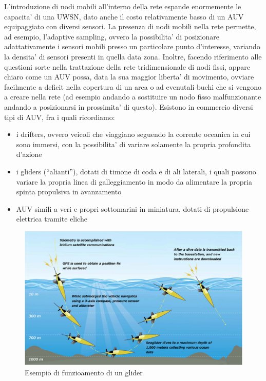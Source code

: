 L'introduzione di nodi mobili all'interno della rete espande enormemente le capacita' di una UWSN, dato anche il costo relativamente basso di un AUV equipaggiato con diversi sensori. \newline
La presenza di nodi mobili nella rete permette, ad esempio, l'adaptive sampling, ovvero la possibilita' di posizionare adattativamente i sensori mobili presso un particolare punto d'interesse, variando la densita' di sensori presenti in quella data zona. \newline
Inoltre, facendo riferimento alle questioni sorte nella trattazione della rete tridimensionale di nodi fissi, appare chiaro come un AUV possa, data la sua maggior liberta' di movimento, ovviare facilmente a deficit nella copertura di un area o ad evenutali buchi che si vengono a creare nella rete (ad esempio andando a sostituire un nodo fisso malfunzionante andando a posizionarsi in prossimita' di questo). \newline
Esistono in commercio diversi tipi di AUV, fra i quali ricordiamo:
\begin{itemize}

\item i drifters, ovvero veicoli che viaggiano seguendo la corrente oceanica in cui sono immersi, con la possibilita' di variare solamente la propria
profondita d'azione

\item i gliders (``alianti''), dotati di timone di coda e di ali laterali, i quali possono variare la propria linea di galleggiamento in modo da alimentare la propria spinta propulsiva in avanzamento

\item AUV simili a veri e propri sottomarini in miniatura, dotati di propulsione elettrica tramite eliche

\end{itemize}
\begin{figure}[H]
    \centering
	\includegraphics[width=\linewidth]{glider.jpg}
	\caption{ Esempio di funzioamento di un glider}
	\label{fig:}
\end{figure}


